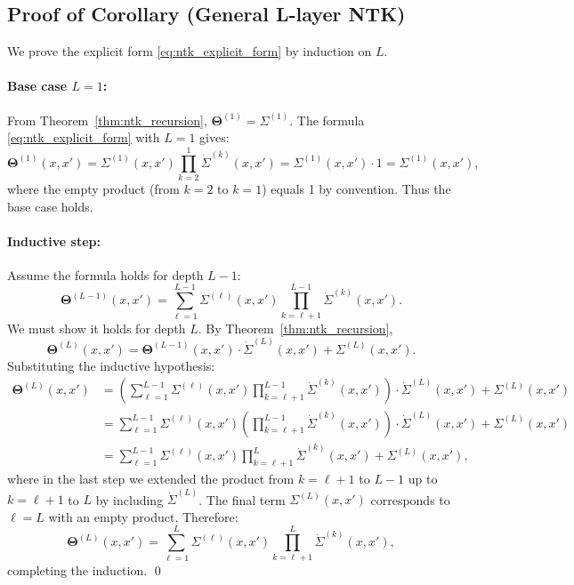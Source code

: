 \documentclass{article}
\newcommand{\Kop}{\boldsymbol{\Theta}}
\begin{document}
\subsection{Proof of Corollary (General L-layer NTK)}\label{appendix:proof-general-L}

We prove the explicit form \eqref{eq:ntk_explicit_form} by induction on \( L \).

\paragraph{Base case \( L=1 \):}
From Theorem~\ref{thm:ntk_recursion}, \( \Kop^{(1)} = \Sigma^{(1)} \). The formula \eqref{eq:ntk_explicit_form} with \( L=1 \) gives:
\[
\Kop^{(1)}(x,x') = \Sigma^{(1)}(x,x') \prod_{k=2}^{1} \dot{\Sigma}^{(k)}(x,x') = \Sigma^{(1)}(x,x') \cdot 1 = \Sigma^{(1)}(x,x'),
\]
where the empty product (from \( k=2 \) to \( k=1 \)) equals 1 by convention. Thus the base case holds.

\paragraph{Inductive step:}
Assume the formula holds for depth \( L-1 \):
\[
\Kop^{(L-1)}(x,x') = \sum_{\ell=1}^{L-1} \Sigma^{(\ell)}(x,x') \prod_{k=\ell+1}^{L-1} \dot{\Sigma}^{(k)}(x,x').
\]
We must show it holds for depth \( L \). By Theorem~\ref{thm:ntk_recursion},
\[
\Kop^{(L)}(x,x') = \Kop^{(L-1)}(x,x')\cdot\dot{\Sigma}^{(L)}(x,x') + \Sigma^{(L)}(x,x').
\]
Substituting the inductive hypothesis:
\begin{align*}
\Kop^{(L)}(x,x') &= \left(\sum_{\ell=1}^{L-1} \Sigma^{(\ell)}(x,x') \prod_{k=\ell+1}^{L-1} \dot{\Sigma}^{(k)}(x,x')\right) \cdot \dot{\Sigma}^{(L)}(x,x') + \Sigma^{(L)}(x,x')\\
&= \sum_{\ell=1}^{L-1} \Sigma^{(\ell)}(x,x') \left(\prod_{k=\ell+1}^{L-1} \dot{\Sigma}^{(k)}(x,x')\right) \cdot \dot{\Sigma}^{(L)}(x,x') + \Sigma^{(L)}(x,x')\\
&= \sum_{\ell=1}^{L-1} \Sigma^{(\ell)}(x,x') \prod_{k=\ell+1}^{L} \dot{\Sigma}^{(k)}(x,x') + \Sigma^{(L)}(x,x'),
\end{align*}
where in the last step we extended the product from \( k=\ell+1 \) to \( L-1 \) up to \( k=\ell+1 \) to \( L \) by including \( \dot{\Sigma}^{(L)} \). The final term \( \Sigma^{(L)}(x,x') \) corresponds to \( \ell=L \) with an empty product. Therefore:
\[
\Kop^{(L)}(x,x') = \sum_{\ell=1}^{L} \Sigma^{(\ell)}(x,x') \prod_{k=\ell+1}^{L} \dot{\Sigma}^{(k)}(x,x'),
\]
completing the induction. \qed
\end{document}
